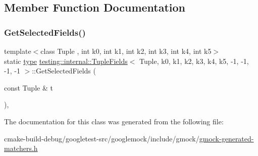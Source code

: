 \subsection{Member Function Documentation}
\mbox{\label{classtesting_1_1internal_1_1TupleFields_3_01Tuple_00_01k0_00_01k1_00_01k2_00_01k3_00_01k4_00_01k15c11b8436218f7eb1523adb30f3f284_a15b4c351182e3b52ec7ce67cb6beb0f8}} 
\subsubsection{\texorpdfstring{GetSelectedFields()}{GetSelectedFields()}}
{\footnotesize\ttfamily template$<$class Tuple , int k0, int k1, int k2, int k3, int k4, int k5$>$ \\
static \mbox{\hyperlink{classtesting_1_1internal_1_1TupleFields_3_01Tuple_00_01k0_00_01k1_00_01k2_00_01k3_00_01k4_00_01k15c11b8436218f7eb1523adb30f3f284_a4e9aef3e026c3b30cfc21b6776616926}{type}} \mbox{\hyperlink{classtesting_1_1internal_1_1TupleFields}{testing\+::internal\+::\+Tuple\+Fields}}$<$ Tuple, k0, k1, k2, k3, k4, k5, -\/1, -\/1, -\/1, -\/1 $>$\+::Get\+Selected\+Fields (\begin{DoxyParamCaption}\item[{const Tuple \&}]{t }\end{DoxyParamCaption})\hspace{0.3cm}{\ttfamily [inline]}, {\ttfamily [static]}}



The documentation for this class was generated from the following file\+:\begin{DoxyCompactItemize}
\item 
cmake-\/build-\/debug/googletest-\/src/googlemock/include/gmock/\mbox{\hyperlink{gmock-generated-matchers_8h}{gmock-\/generated-\/matchers.\+h}}\end{DoxyCompactItemize}
